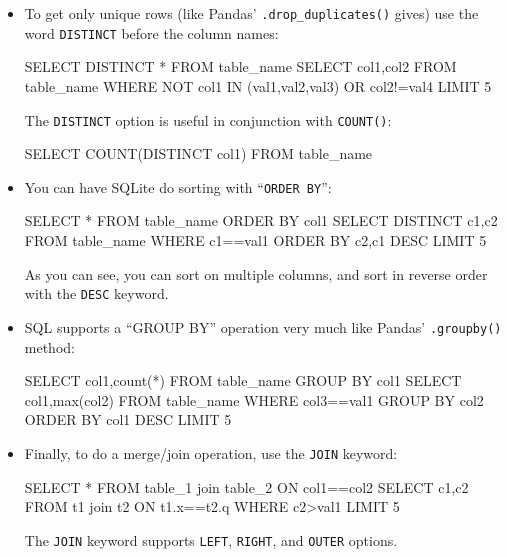 \begin{itemize}
\item To get only unique rows (like Pandas' \texttt{.drop\_duplicates()}
gives) use the word \texttt{DISTINCT} before the column names:

\begin{ShadedCode}
SELECT DISTINCT * FROM table_name
SELECT col1,col2 FROM table_name WHERE NOT col1 IN
            (val1,val2,val3) OR col2!=val4 LIMIT 5
\end{ShadedCode}

The \texttt{DISTINCT} option is useful in conjunction with \texttt{COUNT()}:

\begin{ShadedCode}
SELECT COUNT(DISTINCT col1) FROM table_name
\end{ShadedCode}

\item You can have SQLite do sorting with ``\texttt{ORDER BY}'':

\begin{ShadedCode}
SELECT * FROM table_name ORDER BY col1
SELECT DISTINCT c1,c2 FROM table_name WHERE c1==val1
            ORDER BY c2,c1 DESC LIMIT 5
\end{ShadedCode}

As you can see, you can sort on multiple columns, and sort in reverse order
with the \texttt{DESC} keyword.

\item SQL supports a ``GROUP BY'' operation very much like Pandas'
\texttt{.groupby()} method:

\begin{ShadedCode}
SELECT col1,count(*) FROM table_name GROUP BY col1
SELECT col1,max(col2) FROM table_name WHERE col3==val1
            GROUP BY col2 ORDER BY col1 DESC LIMIT 5
\end{ShadedCode}

\item Finally, to do a merge/join operation, use the \texttt{JOIN} keyword:

\begin{ShadedCode}
SELECT * FROM table_1 join table_2 ON col1==col2
SELECT c1,c2 FROM t1 join t2 ON t1.x==t2.q
            WHERE c2>val1 LIMIT 5
\end{ShadedCode}

The \texttt{JOIN} keyword supports \texttt{LEFT}, \texttt{RIGHT}, and
\texttt{OUTER} options.

\end{itemize}

